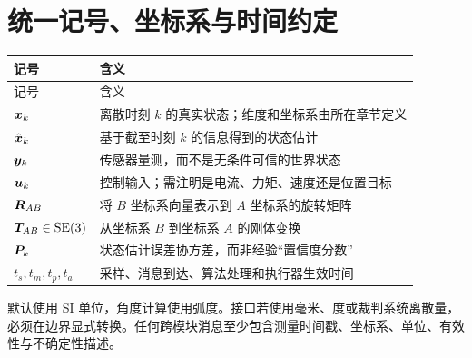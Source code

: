 \chapter*{统一记号、坐标系与时间约定}

\begin{longtable}{p{}p{}}
\toprule
记号 & 含义 \\
\midrule
\endfirsthead
\toprule
记号 & 含义 \\
\midrule
\endhead
$\bm{x}_k$ & 离散时刻 $k$ 的真实状态；维度和坐标系由所在章节定义 \\
$\hat{\bm{x}}_k$ & 基于截至时刻 $k$ 的信息得到的状态估计 \\
$\bm{y}_k$ & 传感器量测，而不是无条件可信的世界状态 \\
$\bm{u}_k$ & 控制输入；需注明是电流、力矩、速度还是位置目标 \\
$\bm{R}_{AB}$ & 将 $B$ 坐标系向量表示到 $A$ 坐标系的旋转矩阵 \\
$\bm{T}_{AB}\in\mathrm{SE}(3)$ & 从坐标系 $B$ 到坐标系 $A$ 的刚体变换 \\
$\bm{P}_k$ & 状态估计误差协方差，而非经验“置信度分数” \\
$t_s,t_m,t_p,t_a$ & 采样、消息到达、算法处理和执行器生效时间 \\
\bottomrule
\end{longtable}

默认使用 SI 单位，角度计算使用弧度。接口若使用毫米、度或裁判系统离散量，必须在边界显式转换。任何跨模块消息至少包含测量时间戳、坐标系、单位、有效性与不确定性描述。

